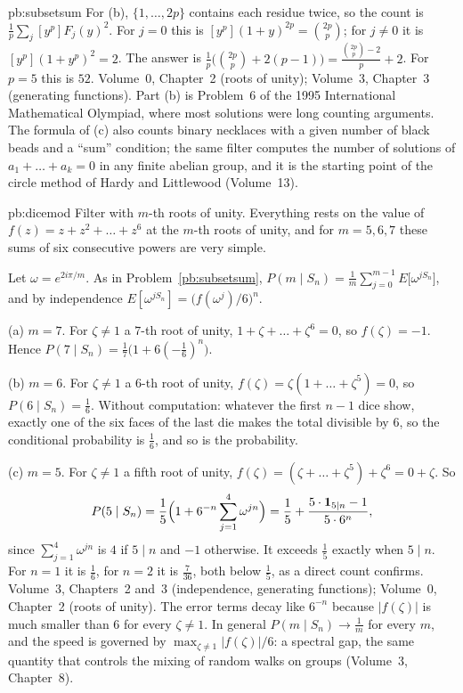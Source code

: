 \begin{solution}{pb:subsetsum}
For (b), $\{1,\dots,2p\}$ contains each residue twice, so the count is $\frac1p\sum_j[y^p]F_j(y)^2$. For $j=0$ this is
$[y^p](1+y)^{2p}=\binom{2p}p$; for $j\ne0$ it is $[y^p](1+y^p)^2=2$. The answer is $\frac1p\bigl(\binom{2p}p+2(p-1)\bigr)
=\frac{\binom{2p}p-2}p+2$. For $p=5$ this is $52$.
\tools Volume~0, Chapter~2 (roots of unity); Volume~3, Chapter~3 (generating functions).
\leads Part (b) is Problem~6 of the 1995 International Mathematical Olympiad, where most solutions were long counting
arguments. The formula of (c) also counts binary necklaces with a given number of black beads and a ``sum'' condition; the
same filter computes the number of solutions of $a_1+\dots+a_k=0$ in any finite abelian group, and it is the starting point
of the circle method of Hardy and Littlewood (Volume~13).
\end{solution}

\begin{solution}{pb:dicemod}
\idea Filter with $m$-th roots of unity. Everything rests on the value of $f(z)=z+z^2+\dots+z^6$ at the $m$-th roots of
unity, and for $m=5,6,7$ these sums of six consecutive powers are very simple.

\writeup Let $\omega=e^{2i\pi/m}$. As in Problem~\ref{pb:subsetsum},
$P(m\mid S_n)=\frac1m\sum_{j=0}^{m-1}E\bigl[\omega^{jS_n}\bigr]$, and by independence
$E[\omega^{jS_n}]=\bigl(f(\omega^j)/6\bigr)^n$.

(a) $m=7$. For $\zeta\ne1$ a $7$-th root of unity, $1+\zeta+\dots+\zeta^6=0$, so $f(\zeta)=-1$. Hence
$P(7\mid S_n)=\frac17\bigl(1+6(-\frac16)^n\bigr)$.

(b) $m=6$. For $\zeta\ne1$ a $6$-th root of unity, $f(\zeta)=\zeta(1+\dots+\zeta^5)=0$, so $P(6\mid S_n)=\frac16$. Without
computation: whatever the first $n-1$ dice show, exactly one of the six faces of the last die makes the total divisible by
$6$, so the conditional probability is $\frac16$, and so is the probability.

(c) $m=5$. For $\zeta\ne1$ a fifth root of unity, $f(\zeta)=(\zeta+\dots+\zeta^5)+\zeta^6=0+\zeta$. So
\[
P(5\mid S_n)=\frac15\Bigl(1+6^{-n}\sum_{j=1}^4\omega^{jn}\Bigr)=\frac15+\frac{5\cdot\mathbf 1_{5\mid n}-1}{5\cdot6^n},
\]
since $\sum_{j=1}^4\omega^{jn}$ is $4$ if $5\mid n$ and $-1$ otherwise. It exceeds $\frac15$ exactly when $5\mid n$. For
$n=1$ it is $\frac16$, for $n=2$ it is $\frac7{36}$, both below $\frac15$, as a direct count confirms.
\tools Volume~3, Chapters~2 and~3 (independence, generating functions); Volume~0, Chapter~2 (roots of unity).
\leads The error terms decay like $6^{-n}$ because $|f(\zeta)|$ is much smaller than $6$ for every $\zeta\ne1$. In general
$P(m\mid S_n)\to\frac1m$ for every $m$, and the speed is governed by $\max_{\zeta\ne1}|f(\zeta)|/6$: a spectral gap, the
same quantity that controls the mixing of random walks on groups (Volume~3, Chapter~8).
\end{solution}

